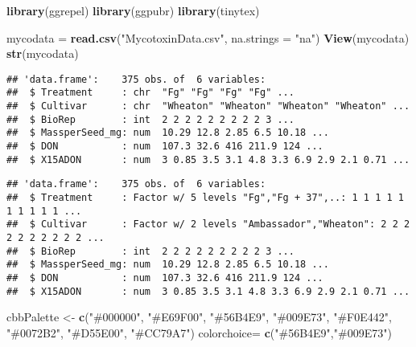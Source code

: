 \documentclass[
]{article}
\newenvironment{Shaded}{\begin{snugshade}}{\end{snugshade}}
\newcommand{\AttributeTok}[1]{\textcolor[rgb]{0.13,0.29,0.53}{#1}}
\newcommand{\FunctionTok}[1]{\textcolor[rgb]{0.13,0.29,0.53}{\textbf{#1}}}
\newcommand{\NormalTok}[1]{#1}
\newcommand{\OtherTok}[1]{\textcolor[rgb]{0.56,0.35,0.01}{#1}}
\newcommand{\SpecialCharTok}[1]{\textcolor[rgb]{0.81,0.36,0.00}{\textbf{#1}}}
\newcommand{\StringTok}[1]{\textcolor[rgb]{0.31,0.60,0.02}{#1}}
\begin{document}
\begin{Shaded}
\begin{Highlighting}[]
\FunctionTok{library}\NormalTok{(ggrepel)}
\FunctionTok{library}\NormalTok{(ggpubr)}
\FunctionTok{library}\NormalTok{(tinytex)}

\NormalTok{mycodata }\OtherTok{=} \FunctionTok{read.csv}\NormalTok{(}\StringTok{"MycotoxinData.csv"}\NormalTok{, }\AttributeTok{na.strings =} \StringTok{"na"}\NormalTok{)}
\FunctionTok{View}\NormalTok{(mycodata)}
\FunctionTok{str}\NormalTok{(mycodata)}
\end{Highlighting}
\end{Shaded}

\begin{verbatim}
## 'data.frame':    375 obs. of  6 variables:
##  $ Treatment     : chr  "Fg" "Fg" "Fg" "Fg" ...
##  $ Cultivar      : chr  "Wheaton" "Wheaton" "Wheaton" "Wheaton" ...
##  $ BioRep        : int  2 2 2 2 2 2 2 2 2 3 ...
##  $ MassperSeed_mg: num  10.29 12.8 2.85 6.5 10.18 ...
##  $ DON           : num  107.3 32.6 416 211.9 124 ...
##  $ X15ADON       : num  3 0.85 3.5 3.1 4.8 3.3 6.9 2.9 2.1 0.71 ...
\end{verbatim}

\begin{Shaded}
\end{Shaded}

\begin{verbatim}
## 'data.frame':    375 obs. of  6 variables:
##  $ Treatment     : Factor w/ 5 levels "Fg","Fg + 37",..: 1 1 1 1 1 1 1 1 1 1 ...
##  $ Cultivar      : Factor w/ 2 levels "Ambassador","Wheaton": 2 2 2 2 2 2 2 2 2 2 ...
##  $ BioRep        : int  2 2 2 2 2 2 2 2 2 3 ...
##  $ MassperSeed_mg: num  10.29 12.8 2.85 6.5 10.18 ...
##  $ DON           : num  107.3 32.6 416 211.9 124 ...
##  $ X15ADON       : num  3 0.85 3.5 3.1 4.8 3.3 6.9 2.9 2.1 0.71 ...
\end{verbatim}

\begin{Shaded}
\begin{Highlighting}[]
\NormalTok{cbbPalette }\OtherTok{\textless{}{-}} \FunctionTok{c}\NormalTok{(}\StringTok{"\#000000"}\NormalTok{, }\StringTok{"\#E69F00"}\NormalTok{, }\StringTok{"\#56B4E9"}\NormalTok{, }\StringTok{"\#009E73"}\NormalTok{, }\StringTok{"\#F0E442"}\NormalTok{, }\StringTok{"\#0072B2"}\NormalTok{, }\StringTok{"\#D55E00"}\NormalTok{, }\StringTok{"\#CC79A7"}\NormalTok{)}
\NormalTok{colorchoice}\OtherTok{=} \FunctionTok{c}\NormalTok{(}\StringTok{"\#56B4E9"}\NormalTok{,}\StringTok{"\#009E73"}\NormalTok{)}
\end{Highlighting}
\end{Shaded}
\end{document}

